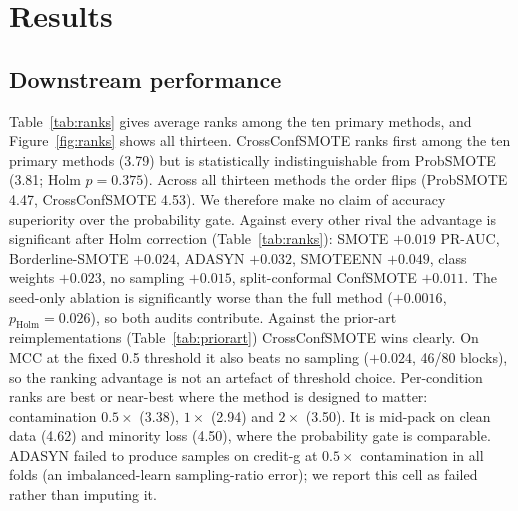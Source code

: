 \documentclass[10pt]{article} %
\begin{document}
\section{Results}

\subsection{Downstream performance}

Table~\ref{tab:ranks} gives average ranks among the ten primary methods, and Figure~\ref{fig:ranks} shows all thirteen. CrossConfSMOTE ranks first among the ten primary methods (3.79) but is statistically indistinguishable from ProbSMOTE (3.81; Holm $p = 0.375$). Across all thirteen methods the order flips (ProbSMOTE 4.47, CrossConfSMOTE 4.53). We therefore make no claim of accuracy superiority over the probability gate. Against every other rival the advantage is significant after Holm correction (Table~\ref{tab:ranks}): SMOTE $+0.019$ PR-AUC, Borderline-SMOTE $+0.024$, ADASYN $+0.032$, SMOTEENN $+0.049$, class weights $+0.023$, no sampling $+0.015$, split-conformal ConfSMOTE $+0.011$. The seed-only ablation is significantly worse than the full method ($+0.0016$, $p_{\mathrm{Holm}} = 0.026$), so both audits contribute. Against the prior-art reimplementations (Table~\ref{tab:priorart}) CrossConfSMOTE wins clearly. On MCC at the fixed 0.5 threshold it also beats no sampling ($+0.024$, 46/80 blocks), so the ranking advantage is not an artefact of threshold choice. Per-condition ranks are best or near-best where the method is designed to matter: contamination $0.5\times$ (3.38), $1\times$ (2.94) and $2\times$ (3.50). It is mid-pack on clean data (4.62) and minority loss (4.50), where the probability gate is comparable. ADASYN failed to produce samples on credit-g at $0.5\times$ contamination in all folds (an imbalanced-learn sampling-ratio error); we report this cell as failed rather than imputing it.
\end{document}
